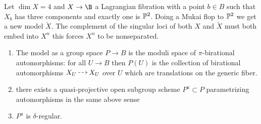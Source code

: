 \documentclass[12pt]{article}
\begin{document}
\begin{example}
Let $\dim{X} = 4$ and $X \to \B$ a Lagrangian fibration with a point $b \in B$ such that $X_b$ has three components and exactly one is $\P^2$. Doing a Mukai flop to $\P^2$ we get a new model $\check{X}$. The complement of the singular loci of both $X$ and $\check{X}$ must both embed into $X^n$ this forces $X^n$ to be nonseparated. 
\end{example}

\begin{theorem}
\begin{enumerate}
\item The \Neron model as a group space $P \to B$ is the moduli space of $\pi$-birational automorphisms: for all $U \to B$ \etale then $P(U)$ is the collection of birational automorphisms $X_U \rat X_U$ over $U$ which are translations on the generic fiber.  
\item there exists a quasi-projective open subgroup scheme $P^a \subset P$ parametrizing automorphisms in the same above sense
\item $P^a$ is $\delta$-regular.
\end{enumerate}
\end{theorem}
\end{document}
